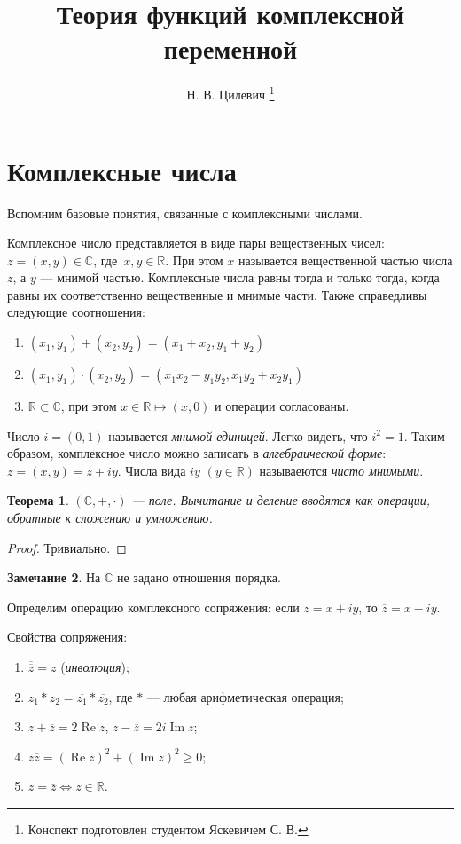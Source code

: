 \documentclass[11pt,openany,a4paper]{scrartcl}
\author{Н. В. Цилевич \thanks{Конспект подготовлен студентом Яскевичем С. В.}}
\title{Теория функций комплексной переменной}
\theoremstyle{plain}
\newtheorem{theorem}{Теорема}[section]
\theoremstyle{definition}
\newtheorem{remark}[theorem]{Замечание}
\newcommand\mb{\mathbb}
\newcommand\real{\mb R}
\newcommand{\complex}{\mb C}
\DeclareMathOperator{\Ree}{Re}
\DeclareMathOperator{\Img}{Im}
\begin{document}
\maketitle

\tableofcontents

\pagebreak

\section{Комплексные числа}

Вспомним базовые понятия, связанные с комплексными числами.

Комплексное число представляется в виде пары вещественных чисел: $ z = (x, y) \in \complex$,
где~$ x,y \in \real$. При этом $x$ называется вещественной частью числа $z$, а $y$ — мнимой частью. Комплексные
числа равны тогда и только тогда, когда равны их соответственно вещественные и мнимые части. Также справедливы
следующие соотношения:
\begin{enumerate}
	\item $(x_1, y_1) + (x_2, y_2) = (x_1 + x_2, y_1 + y_2)$
	\item $(x_1, y_1) \cdot (x_2, y_2) = (x_1x_2 - y_1y_2, x_1y_2 + x_2y_1)$
	\item $\real \subset \complex$, при этом $x \in \real \mapsto (x, 0)$ и операции согласованы.
\end{enumerate}

Число $i = (0, 1)$ называется \emph{мнимой единицей}. Легко видеть, что $i^2 = 1$. Таким образом, комплексное
число можно записать в \emph{алгебраической форме}: $z = (x, y) = z + iy$. Числа вида $iy$ $(y \in \real)$
называеются \emph{чисто мнимыми}.

\begin{theorem}
	$(\complex, +, \cdot)$ — поле. Вычитание и деление вводятся как операции, обратные к сложению и умножению.
\end{theorem}
\begin{proof}
	Тривиально.
\end{proof}
\begin{remark}
	На $\complex$ не задано отношения порядка.
\end{remark}

Определим операцию комплексного сопряжения: если $z = x + iy$, то $\overline z = x - iy$.

Свойства сопряжения:
\begin{enumerate}
	\item $\overline{\overline z} = z$ (\emph{инволюция});
	\item $\overline{z_1 \ast z_2} = \overline{z_1} \ast \overline{z_2}$, где $\ast$ — любая арифметическая операция;
	\item $z + \overline z = 2\Ree z$, $z - \overline z = 2i\Img z$;
	\item $z\overline z = (\Ree z)^2 + (\Img z)^2 \geqslant 0$;
	\item $z = \overline z \iff z \in \real$.
\end{enumerate}
\end{document}
